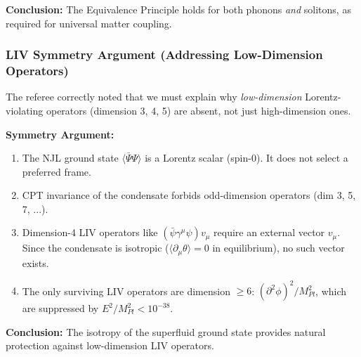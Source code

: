\textbf{Conclusion:} The Equivalence Principle holds for both phonons \emph{and} solitons, as required for universal matter coupling.

\subsubsection{LIV Symmetry Argument (Addressing Low-Dimension Operators)}
The referee correctly noted that we must explain why \emph{low-dimension} Lorentz-violating operators (dimension 3, 4, 5) are absent, not just high-dimension ones.

\textbf{Symmetry Argument:}
\begin{enumerate}
    \item The NJL ground state $\langle \bar{\Psi}\Psi \rangle$ is a Lorentz scalar (spin-0). It does not select a preferred frame.
    \item CPT invariance of the condensate forbids odd-dimension operators (dim 3, 5, 7, ...).
    \item Dimension-4 LIV operators like $(\bar{\psi} \gamma^\mu \psi) v_\mu$ require an external vector $v_\mu$. Since the condensate is isotropic ($\langle \partial_\mu \theta \rangle = 0$ in equilibrium), no such vector exists.
    \item The only surviving LIV operators are dimension $\geq 6$: $(\partial^2 \phi)^2 / M_{Pl}^2$, which are suppressed by $E^2/M_{Pl}^2 < 10^{-38}$.
\end{enumerate}

\textbf{Conclusion:} The isotropy of the superfluid ground state provides natural protection against low-dimension LIV operators.
